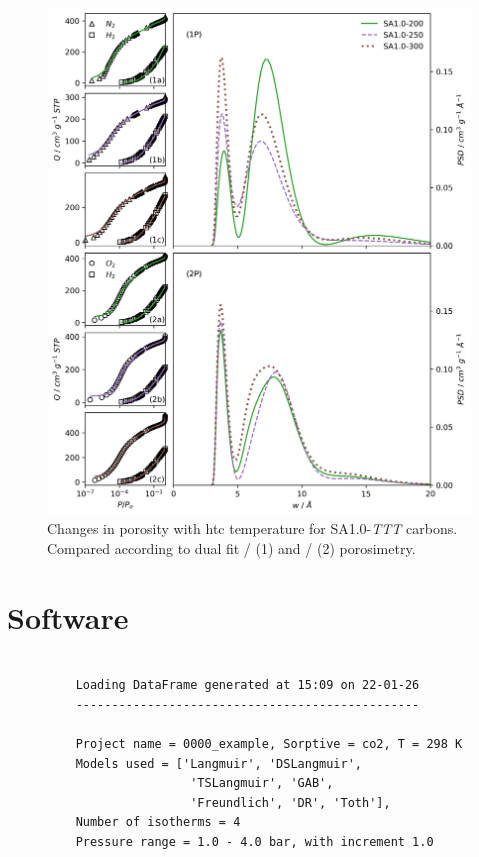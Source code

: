 \begin{appendices}
\begin{figure}[hptb]
    \centering
    \includegraphics[width=\columnwidth, keepaspectratio]{5-dual_isotherm/figs/SA100-xxx_isopsd.png}
    \caption{Changes in porosity with \gls{htc} temperature for SA1.0-\textit{TTT} carbons. Compared according to dual fit / (1) and / (2) porosimetry.}
    \label{fig:SA100-xxx_isoposd}
\end{figure}

\chapter{Software}
\newpage

\begin{figure}[h]
\centering
    \begin{verbatim}
        
    Loading DataFrame generated at 15:09 on 22-01-26
    ------------------------------------------------
    
    Project name = 0000_example, Sorptive = co2, T = 298 K
    Models used = ['Langmuir', 'DSLangmuir', 
                    'TSLangmuir', 'GAB', 
                    'Freundlich', 'DR', 'Toth'], 
    Number of isotherms = 4
    Pressure range = 1.0 - 4.0 bar, with increment 1.0
                

\end{verbatim}
\end{figure}
\end{appendices}
